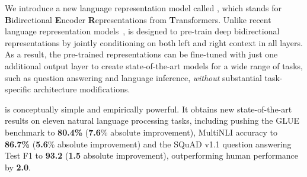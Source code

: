 We introduce a new language representation model called {\bf \bert}, which stands for \textbf{B}idirectional \textbf{E}ncoder \textbf{R}epresentations from \textbf{T}ransformers. Unlike recent language representation models~\cite{peters-etal:2018:_deep, radford-etal:2018},  \bert is designed to pre-train deep bidirectional representations by jointly conditioning on both left and right context in all layers. As a result, the pre-trained \bert representations can be fine-tuned with just one additional output layer to create state-of-the-art models for a wide range of tasks, such as question answering and language inference, {\em without} substantial task-specific architecture modifications.

\bert is conceptually simple and empirically powerful. It obtains new state-of-the-art results on eleven natural language processing tasks, including pushing the GLUE benchmark to {\bf 80.4\%} ({\bf 7.6}\% absolute improvement), MultiNLI accuracy to {\bf 86.7\%} ({\bf 5.6}\% absolute improvement) and the SQuAD v1.1 question answering Test F1 to {\bf 93.2} ({\bf 1.5} absolute improvement), outperforming human performance by {\bf 2.0}.
